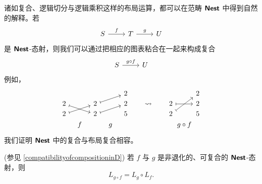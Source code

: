 诸如复合、逻辑切分与逻辑乘积这样的布局运算，都可以在范畴 ${\boldsymbol{\mathsf{Nest}}}$ 中得到自然的解释。若
\[
\begin{tikzcd}
    S \ar[r,"f"]  & T \ar[r,"g"]  & U
\end{tikzcd}
\]
是 ${\boldsymbol{\mathsf{Nest}}}$-态射，则我们可以通过把相应的图表粘合在一起来构成复合
\[\begin{tikzcd}
S \ar[r,"g \circ f"] &  U
\end{tikzcd} \]
例如，
\[ \begin{tikzcd}[row sep = 1, column sep = 8]
 & &   & & 2 & & & & & & 2\\
2 \ar[drr,mapsto]  & & 2 \ar[urr,mapsto] & & 2 & & \rightsquigarrow & & 2 \ar[rr,mapsto]  & & 2\\
2 \ar[urr,mapsto] & & 2 \ar[urr,mapsto] & & 5 & & & & 2 \ar[uurr,mapsto] & & 5\\
 & f & & g & & & & & & \mathclap{g \circ f} & 
\end{tikzcd}\]
我们证明 ${\boldsymbol{\mathsf{Nest}}}$ 中的复合与布局复合相容。
\begin{mainthm}(参见 \ref{compatibilityofcompositioninD}) 若 $f$ 与 $g$ 是非退化的、可复合的 ${\boldsymbol{\mathsf{Nest}}}$-态射，则
\[
L_{g \circ f} = L_g \circ L_f.
\]
\end{mainthm}

